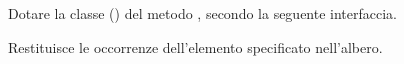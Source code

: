Dotare la classe  () del metodo , secondo la seguente interfaccia.

\begin{methodslist}

 {
Restituisce le occorrenze dell'elemento specificato nell'albero.
}

\end{methodslist}
